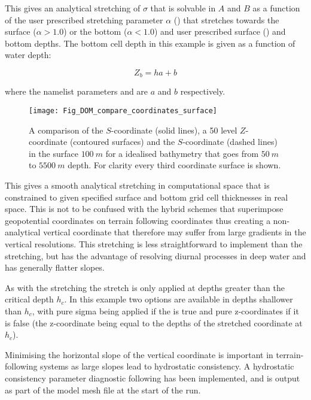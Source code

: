 \documentclass[../main/NEMO_manual]{subfiles}
\begin{document}
This gives an analytical stretching of $\sigma$ that is solvable in $A$ and $B$ as a function of
the user prescribed stretching parameter $\alpha$ () that stretches towards
the surface ($\alpha > 1.0$) or the bottom ($\alpha < 1.0$) and
user prescribed surface () and bottom depths.
The bottom cell depth in this example is given as a function of water depth:

\[
  Z_b = h a + b
\]

where the namelist parameters  and  are $a$ and $b$ respectively.

\begin{figure}[!ht]
  \texttt{[image: Fig\_DOM\_compare\_coordinates\_surface]}
  \caption{
    A comparison of the \citet{Song_Haidvogel_JCP94} $S$-coordinate (solid lines),
    a 50 level $Z$-coordinate (contoured surfaces) and
    the \citet{Siddorn_Furner_OM12} $S$-coordinate (dashed lines) in the surface $100~m$ for
    a idealised bathymetry that goes from $50~m$ to $5500~m$ depth.
    For clarity every third coordinate surface is shown.
  }
  \label{fig:fig_compare_coordinates_surface}
\end{figure}

This gives a smooth analytical stretching in computational space that is constrained to
given specified surface and bottom grid cell thicknesses in real space.
This is not to be confused with the hybrid schemes that
superimpose geopotential coordinates on terrain following coordinates thus
creating a non-analytical vertical coordinate that
therefore may suffer from large gradients in the vertical resolutions.
This stretching is less straightforward to implement than the \citet{Song_Haidvogel_JCP94} stretching,
but has the advantage of resolving diurnal processes in deep water and has generally flatter slopes.

As with the \citet{Song_Haidvogel_JCP94} stretching the stretch is only applied at depths greater than
the critical depth $h_c$.
In this example two options are available in depths shallower than $h_c$,
with pure sigma being applied if the  is true and pure z-coordinates if it is false
(the z-coordinate being equal to the depths of the stretched coordinate at $h_c$).

Minimising the horizontal slope of the vertical coordinate is important in terrain-following systems as
large slopes lead to hydrostatic consistency.
A hydrostatic consistency parameter diagnostic following \citet{Haney1991} has been implemented,
and is output as part of the model mesh file at the start of the run.
\end{document}
